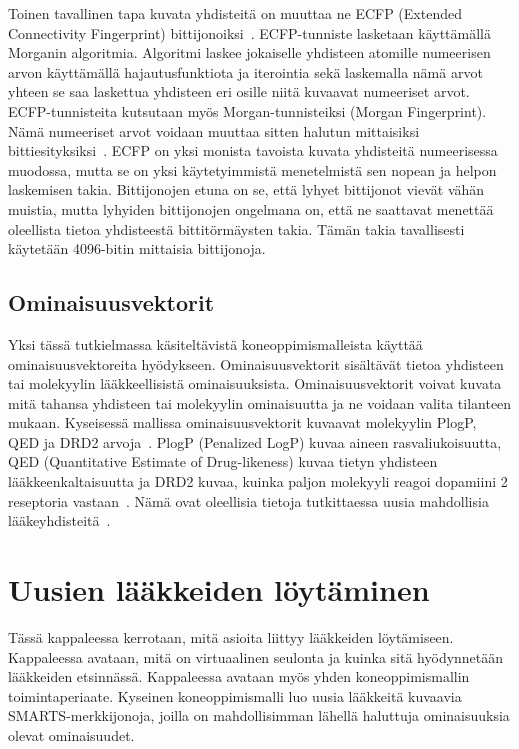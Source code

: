 \documentclass[finnish,twoside,censored,tkt,sw-line]{HYthesisML}
\begin{document}
Toinen tavallinen tapa kuvata yhdisteitä on muuttaa ne ECFP (Extended Connectivity Fingerprint) bittijonoiksi~\cite{RogersDavid2010EF}.
ECFP-tunniste lasketaan käyttämällä Morganin algoritmia.
Algoritmi laskee jokaiselle yhdisteen atomille numeerisen arvon käyttämällä hajautusfunktiota ja iterointia sekä laskemalla nämä arvot yhteen se saa laskettua yhdisteen eri osille niitä kuvaavat numeeriset arvot.
ECFP-tunnisteita kutsutaan myös Morgan-tunnisteiksi (Morgan Fingerprint).
Nämä numeeriset arvot voidaan muuttaa sitten halutun mittaisiksi bittiesityksiksi~\cite{RogersDavid2010EF}.
ECFP on yksi monista tavoista kuvata yhdisteitä numeerisessa muodossa, mutta se on yksi käytetyimmistä menetelmistä sen nopean ja helpon laskemisen takia.
Bittijonojen etuna on se, että lyhyet bittijonot vievät vähän muistia, mutta lyhyiden bittijonojen ongelmana on, että ne saattavat menettää oleellista tietoa yhdisteestä bittitörmäysten takia.
Tämän takia tavallisesti käytetään 4096-bitin mittaisia bittijonoja.

\section{Ominaisuusvektorit}

Yksi tässä tutkielmassa käsiteltävistä koneoppimismalleista käyttää ominaisuusvektoreita hyödykseen.
Ominaisuusvektorit sisältävät tietoa yhdisteen tai molekyylin lääkkeellisistä ominaisuuksista.
Ominaisuusvektorit voivat kuvata mitä tahansa yhdisteen tai molekyylin ominaisuutta ja ne voidaan valita tilanteen mukaan.
Kyseisessä mallissa ominaisuusvektorit kuvaavat molekyylin PlogP, QED ja DRD2 arvoja~\cite{ShinBonggun}.
PlogP (Penalized LogP) kuvaa aineen rasvaliukoisuutta, QED (Quantitative Estimate of Drug-likeness) kuvaa tietyn yhdisteen lääkkeenkaltaisuutta ja DRD2 kuvaa, kuinka paljon molekyyli reagoi dopamiini 2 reseptoria vastaan~\cite{BickertonGRichard2012Qtcb}.
Nämä ovat oleellisia tietoja tutkittaessa uusia mahdollisia lääkeyhdisteitä~\cite{ShinBonggun}.

\chapter{Uusien lääkkeiden löytäminen}

Tässä kappaleessa kerrotaan, mitä asioita liittyy lääkkeiden löytämiseen.
Kappaleessa avataan, mitä on virtuaalinen seulonta ja kuinka sitä hyödynnetään lääkkeiden etsinnässä.
Kappaleessa avataan myös yhden koneoppimismallin toimintaperiaate.
Kyseinen koneoppimismalli luo uusia lääkkeitä kuvaavia SMARTS-merkkijonoja, joilla on mahdollisimman lähellä haluttuja ominaisuuksia olevat ominaisuudet.
\end{document}
